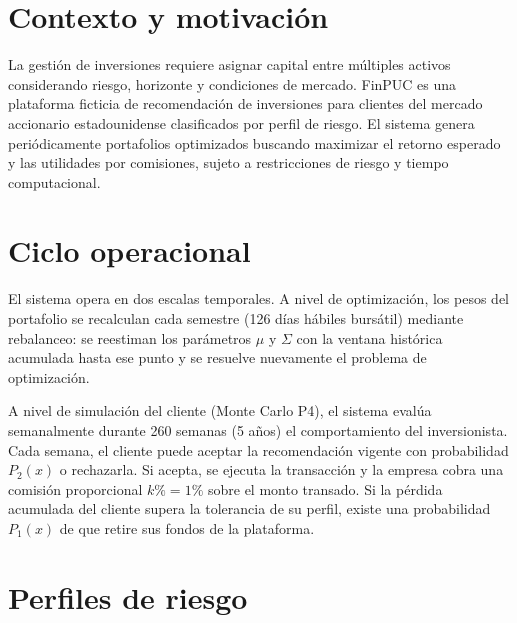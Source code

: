 \section{Contexto y motivación}

La gesti\'on de inversiones requiere asignar capital entre m\'ultiples activos considerando riesgo, horizonte y condiciones de mercado. FinPUC es una plataforma ficticia de recomendaci\'on de inversiones para clientes del mercado accionario estadounidense clasificados por perfil de riesgo. El sistema genera peri\'odicamente portafolios optimizados buscando maximizar el retorno esperado y las utilidades por comisiones, sujeto a restricciones de riesgo y tiempo computacional.

\section{Ciclo operacional}

El sistema opera en dos escalas temporales. A nivel de optimizaci\'on, los
pesos del portafolio se recalculan cada semestre (126 d\'ias h\'abiles bursátil) mediante
rebalanceo: se reestiman los par\'ametros $\mu$ y $\Sigma$ con la ventana
hist\'orica acumulada hasta ese punto y se resuelve nuevamente el problema de
optimizaci\'on.

A nivel de simulaci\'on del cliente (Monte Carlo P4), el sistema eval\'ua
semanalmente durante 260 semanas (5 a\~nos) el comportamiento del
inversionista. Cada semana, el cliente puede aceptar la recomendaci\'on vigente
con probabilidad $P_2(x)$ o rechazarla. Si acepta, se ejecuta la
transacci\'on y la empresa cobra una comisi\'on proporcional $k\% = 1\%$ sobre
el monto transado. Si la p\'erdida acumulada del cliente supera la tolerancia
de su perfil, existe una probabilidad $P_1(x)$ de que retire sus fondos de la
plataforma.

\section{Perfiles de riesgo}


